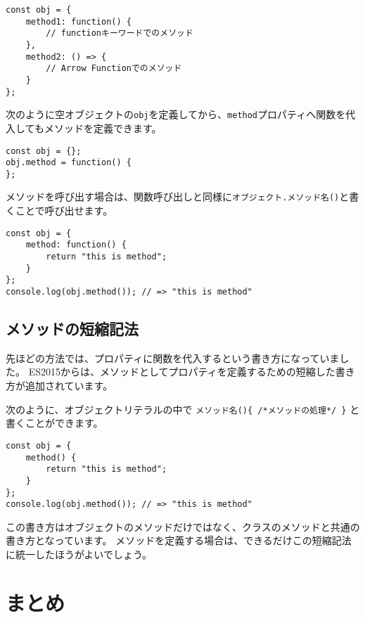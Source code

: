 \begin{lstlisting}
const obj = {
    method1: function() {
        // functionキーワードでのメソッド
    },
    method2: () => {
        // Arrow Functionでのメソッド
    }
};
\end{lstlisting}

次のように空オブジェクトの\texttt{obj}を定義してから、\texttt{method}プロパティへ関数を代入してもメソッドを定義できます。

\begin{lstlisting}
const obj = {};
obj.method = function() {
};
\end{lstlisting}

メソッドを呼び出す場合は、関数呼び出しと同様に\texttt{オブジェクト.\hbox{}メソッド名()}と書くことで呼び出せます。

\begin{lstlisting}
const obj = {
    method: function() {
        return "this is method";
    }
};
console.log(obj.method()); // => "this is method"
\end{lstlisting}

\hypertarget{shorthand-for-method}{%
\subsection[メソッドの短縮記法]{メソッドの短縮記法\,\protect{}}\label{shorthand-for-method}}

先ほどの方法では、プロパティに関数を代入するという書き方になっていました。
ES2015からは、メソッドとしてプロパティを定義するための短縮した書き方が追加されています。

次のように、オブジェクトリテラルの中で
\texttt{メソッド名()\{ /*メソッドの処理*/ \}}
と書くことができます。

\begin{lstlisting}
const obj = {
    method() {
        return "this is method";
    }
};
console.log(obj.method()); // => "this is method"
\end{lstlisting}

この書き方はオブジェクトのメソッドだけではなく、クラスのメソッドと共通の書き方となっています。
メソッドを定義する場合は、できるだけこの短縮記法に統一したほうがよいでしょう。

\hypertarget{function-declaration-summary}{%
\section{まとめ}\label{function-declaration-summary}}

